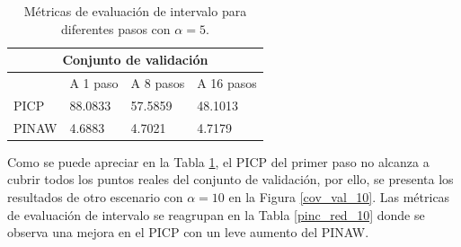\documentclass[12pt]{article}
\begin{document}
\begin{table}[h!]
	\centering
	\caption{Métricas de evaluación de intervalo para diferentes pasos con $\alpha = 5$.}
	\begin{tabular}{|l|l|l|l|}
		\hline
		\multicolumn{4}{|c|}{Conjunto de validación} \\ \hline
			& A 1 paso &A 8 pasos & A 16 pasos \\\hline
		PICP     & 88.0833   & 57.5859   & 48.1013   \\ \hline
		PINAW    & 4.6883    & 4.7021    & 4.7179    \\ \hline
	\end{tabular}
\label{pinc_red}
\end{table}

Como se puede apreciar en la Tabla \ref{pinc_red}, el PICP del primer paso no alcanza a cubrir todos los puntos reales del conjunto de validación, por ello, se presenta los resultados de otro escenario con $\alpha=10$ en la Figura \ref{cov_val_10}. Las métricas de evaluación de intervalo se reagrupan en la Tabla \ref{pinc_red_10} donde se observa una mejora en el PICP con un leve aumento del PINAW.
\end{document}
